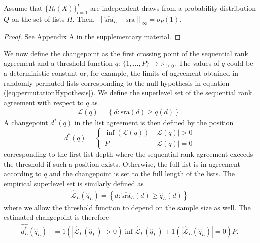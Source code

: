 \documentclass[oupdraft]{bio}
\begin{document}
\begin{theorem}
  Assume that $\{R_l(X)\}_{l=1}^L$ are independent draws from a
  probability distribution $Q$ on the set of lists $\Pi$. Then,
  $\left\|\widehat{\textrm{sra}}_L - \textrm{sra}\right\|_\infty =
  o_P(1)$.
\label{thm:consistency}
\begin{proof}
See Appendix A in the supplementary material.%
\end{proof}
\end{theorem}

We now define the changepoint as the first crossing point of the
sequential rank agreement and a threshold function
$q\colon\,\{1,\ldots,P\} \mapsto \mathbb{R}_{\geq 0}$. The values of
$q$ could be a deterministic constant or, %
for example, the limits-of-agreement obtained in randomly permuted
lists corresponding to the null-hypothesis in equation
(\ref{eq:permutationHypothesis}). We define the superlevel set of the
sequential rank agreement with respect to $q$ as
\begin{align}
  \mathcal{L}(q) = \left\{d : \textrm{sra}(d) \geq q(d)\right\}.
\end{align}
A changepoint $d^\ast(q)$ in the list agreement is then defined by the position
\begin{equation}
  d^\ast(q) =
  \begin{cases}
    \inf(\mathcal{L}(q)) & |\mathcal{L}(q)| > 0\\
  P & |\mathcal{L}(q)| = 0
  \end{cases}
\end{equation}
corresponding to the first list depth where the sequential rank
agreement exceeds the threshold if such a position exists. Otherwise,
the full list is in agreement according to $q$ and the changepoint is
set to the full length of the lists. The empirical superlevel set is
similarly defined as
\begin{align}
 \widehat{\mathcal{L}}_L(\widehat{q}_L) = \left\{d : \widehat{\textrm{sra}}_L(d) \geq \widehat{q}_L(d)\right\}
\end{align}
where we allow the threshold function to depend on the sample size as
well. The estimated changepoint is therefore
\begin{align}
  \widehat{d^\ast_L}(\widehat{q}_L) &= 1(|\widehat{\mathcal{L}}_L(\widehat{q}_L)| > 0)\inf \widehat{\mathcal{L}}_L(\widehat{q}_L) + 1(|\widehat{\mathcal{L}}_L(\widehat{q}_L)| = 0)P.
\end{align}
\end{document}
